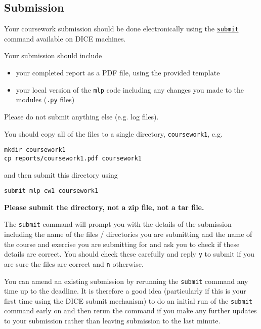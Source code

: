 \documentclass[11pt,]{article}
\begin{document}
\subsection{Submission}
\label{sec:submission}

Your coursework submission should be done electronically using the
\href{http://computing.help.inf.ed.ac.uk/submit}{\texttt{submit}}
command available on DICE machines.

Your submission should include

\begin{itemize}

\item
  your completed report as a PDF file, using the provided template
\item
  your local version of the \texttt{mlp} code including any changes
  you made to the modules (\texttt{.py} files)
\end{itemize}
Please do not submit anything else (e.g. log files).

You should copy all of the files to a single directory, \verb+coursework1+, e.g.

\begin{verbatim}
mkdir coursework1
cp reports/coursework1.pdf coursework1
\end{verbatim}


and then submit this directory using

\begin{verbatim}
submit mlp cw1 coursework1
\end{verbatim}

\textbf{Please submit the directory, not a zip file, not a tar file.}

The \texttt{submit} command will prompt you with the details of the
submission including the name of the files / directories you are
submitting and the name of the course and exercise you are submitting
for and ask you to check if these details are correct. You should check
these carefully and reply \texttt{y} to submit if you are sure the files
are correct and \texttt{n} otherwise.

You can amend an existing submission by rerunning the \texttt{submit}
command any time up to the deadline. It is therefore a good idea
(particularly if this is your first time using the DICE submit
mechanism) to do an initial run of the \texttt{submit} command early on
and then rerun the command if you make any further updates to your
submission rather than leaving submission to the last minute.
\end{document}
